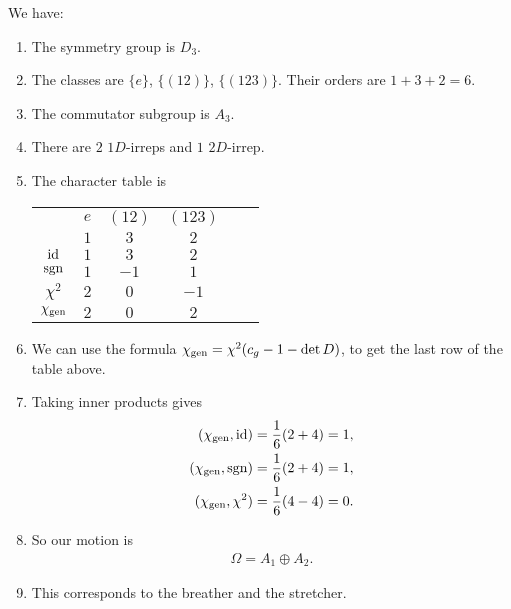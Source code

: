 \documentclass[11pt]{article}
\begin{document}
\begin{eexample}
    [Triangle]
    We have:
    \begin{enumerate}
        \item The symmetry group is $D_3$.
        \item The classes are $\{ e \}$, $\{ (12) \}$, $\{ (123) \}$.
        Their orders are $1 + 3 + 2 = 6$.
        \item The commutator subgroup is $A_3$.
        \item There are $2$ $1D$-irreps and $1$ $2D$-irrep.
        \item The character table is
        \begin{table}[H]
            \centering
            \begin{tabular}{|c|c|c|c|c|c|}
                \hline
                 & $e$ & $(12)$ & $(123)$\\
                 & $1$ & $3$ & $2$\\
                \hline
                $\id$ & $1$ & $3$ & $2$\\
                ${\rm sgn}$ & $1$ & $-1$ & $1$\\
                $\chi^2$ & $2$ & $0$ & $-1$\\
                $\chi_{\rm gen}$ & $2$ & $0$ & $2$\\
                \hline
            \end{tabular}
        \end{table}
        \item We can use the formula $\chi_{\rm gen} = \chi^2 (c_g - 1 - \det{D})$,
        to get the last row of the table above.
        \item Taking inner products gives
        \begin{align*}
            (\chi_{\rm gen}, \id) & = \frac{1}{6} (2 + 4) = 1,\\
            (\chi_{\rm gen}, \sgn) & = \frac{1}{6} (2 + 4) = 1,\\
            (\chi_{\rm gen}, \chi^2) & = \frac{1}{6} (4 - 4) = 0.
        \end{align*}
        \item So our motion is
        \begin{align*}
            \boxed{\Omega = A_1 \oplus A_2.}
        \end{align*}
        \item This corresponds to the breather and the stretcher.
    \end{enumerate}
\end{eexample}
\end{document}
